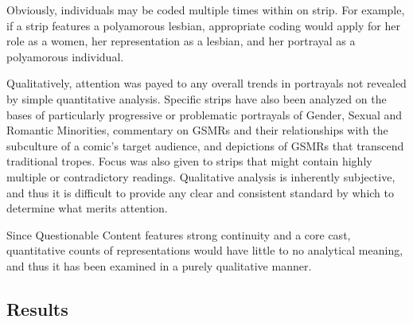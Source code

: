 \documentclass[man,12pt]{apa6}
\begin{document}
 Obviously, individuals may be coded multiple times within on strip. For example, if a strip features a polyamorous lesbian, appropriate coding would apply for her role as a women, her representation as a lesbian, and her portrayal as a polyamorous individual. 

Qualitatively, attention was payed to any overall trends in portrayals not revealed by simple quantitative analysis. Specific strips have also been analyzed on the bases of particularly progressive or problematic portrayals of Gender, Sexual and Romantic Minorities, commentary on GSMRs and their relationships with the subculture of a comic's target audience, and depictions of GSMRs that transcend traditional tropes. Focus was also given to strips that might contain highly multiple or contradictory readings. Qualitative analysis is inherently subjective, and thus it is difficult to provide any clear and consistent standard by which to determine what merits attention. 

Since Questionable Content features strong continuity and a core cast, quantitative counts of representations would have little to no analytical meaning, and thus it has been examined in a purely qualitative manner. 

\subsection{Results}
\end{document}
